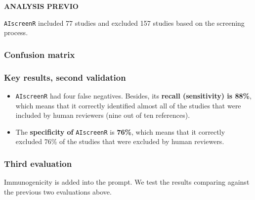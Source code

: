 \documentclass[
  letterpaper,
  DIV=11,
  numbers=noendperiod]{scrartcl}
\newenvironment{Shaded}{\begin{snugshade}}{\end{snugshade}}
\newcommand{\CommentTok}[1]{\textcolor[rgb]{0.37,0.37,0.37}{#1}}
\begin{document}
\textbf{ANALYSIS PREVIO}

\begin{Shaded}
\end{Shaded}

\texttt{AIscreenR} included 77 studies and excluded 157 studies based on
the screening process.

\subsubsection{Confusion matrix}\label{confusion-matrix}

\subsubsection{Key results, second
validation}\label{key-results-second-validation}

\begin{itemize}
\item
  \texttt{AIscreenR} had four false negatives. Besides, its
  \textbf{recall (sensitivity) is 88\%}, which means that it correctly
  identified almost all of the studies that were included by human
  reviewers (nine out of ten references).
\item
  The \textbf{specificity of} \texttt{AIscreenR} is \textbf{76\%}, which
  means that it correctly excluded 76\% of the studies that were
  excluded by human reviewers.
\end{itemize}

\subsubsection{Third evaluation}\label{third-evaluation}

Immunogenicity is added into the prompt. We test the results comparing
against the previous two evaluations above.
\end{document}
